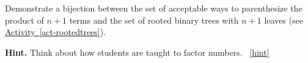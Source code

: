 \documentclass{book}
\begin{document}
\setcounter{project}{180}
\addtocounter{project}{-1}
\begin{activity}[]\label{activity-173}
\hypertarget{p-1033}{}%
Demonstrate a bijection between the set of acceptable ways to parenthesize the product of \(n+1\) terms and the set of rooted binary trees with \(n+1\) leaves (see \hyperref[act-rootedtrees]{Activity~\ref{act-rootedtrees}}).%
\par\smallskip%
\noindent\textbf{Hint.}\hypertarget{hint-120}{}\quad%
\hypertarget{p-1034}{}%
Think about how students are taught to factor numbers.%
~\hfill{\tiny\hyperlink{a-180}{[hint]}\hypertarget{q-180}{}}\end{activity}

\clearpage
\end{document}

